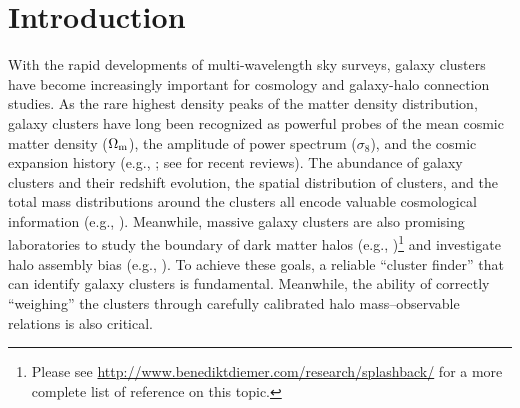 \documentclass[fleqn,usenatbib,useAMS,english]{mnras}
\begin{document}


\section{Introduction}
    \label{sec:intro}
    
    
    With the rapid developments of multi-wavelength sky surveys, galaxy clusters
    have become increasingly important for cosmology and galaxy-halo connection studies.
    As the rare highest density peaks of the matter density distribution, galaxy clusters 
    have long been recognized as powerful probes of the mean cosmic matter density 
    ($\Omega_{\rm m}$), the amplitude of power spectrum ($\sigma_{8}$), and the cosmic expansion
    history (e.g.,
    \citealt{Evrard1989, Peebles1989, White1993, Viana1996, Wang1998}; 
    see \citealt{Allen2011, Kravtsov2012, Weinberg2013} for recent reviews).
    The abundance of galaxy clusters and their redshift evolution, the spatial distribution of 
    clusters, and the total mass distributions around the clusters all encode valuable 
    cosmological information (e.g., \citealt{Haiman2001, Holder2001, Vikhlinin2009b, Rozo2010, 
    Benson2013, Mantz2014, Bocquet2019, Abbott2020, To2021a, To2021b, Wu2021}).
    Meanwhile, massive galaxy clusters are also promising laboratories to study the boundary of
    dark matter halos (e.g., \citealt{Diemer2014, More2015b,
    More2016, Chang2018, Shin2019, Zurcher2019, Tomooka2020})\footnote{Please see
    \url{http://www.benediktdiemer.com/research/splashback/} for a more complete list of
    reference on this topic.} and investigate halo assembly bias (e.g., \citealt{Miyatake2016,
    Zu2017}).
    To achieve these goals, a reliable ``cluster finder'' that can identify galaxy clusters 
    is fundamental.
    Meanwhile, the ability of correctly ``weighing'' the clusters through 
    carefully calibrated halo mass--observable relations is also critical.
    
\end{document}
